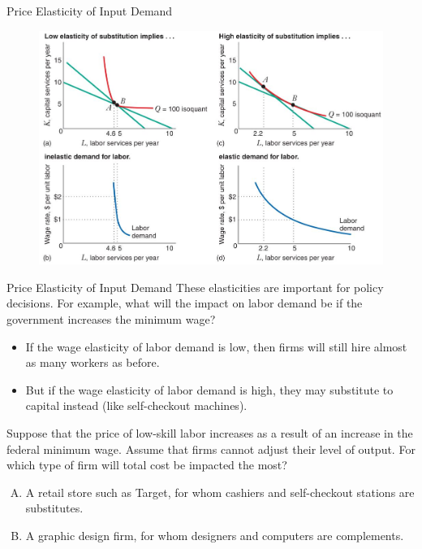 \documentclass[11pt,t]{beamer}
\begin{document}
\begin{frame}{Price Elasticity of Input Demand}
  \begin{figure}
    \includegraphics[width=0.9\linewidth]{figures/fig7_11.jpg}
  \end{figure}
\end{frame}

\begin{frame}{Price Elasticity of Input Demand}
  These elasticities are important for policy decisions. For example, what will the impact on labor demand be if the government increases the minimum wage?
  
  \begin{itemize}
    \item If the wage elasticity of labor demand is low, then firms will still hire almost as many workers as before. 
    
    \item But if the wage elasticity of labor demand is high, they may substitute to capital instead (like self-checkout machines).
  \end{itemize}
\end{frame}

\begin{frame}

  \bigskip
  Suppose that the price of low-skill labor increases as a result of an increase in the federal minimum wage. Assume that firms cannot adjust their level of output. For which type of firm will total cost be impacted the most?

  \bigskip
  \begin{enumerate}[A)]
    \item A retail store such as Target, for whom cashiers and self-checkout stations are substitutes.
    \item A graphic design firm, for whom designers and computers are complements.
  \end{enumerate}
\end{frame}
\end{document}
